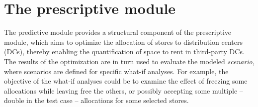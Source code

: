 \documentclass[ijoc,sglanonrev]{informs4}
\begin{document}
\section{The prescriptive module} \label{Sec:optimization}

The predictive module provides a structural component of the prescriptive module, which aims to optimize the allocation of stores to distribution centers (DCs), thereby enabling the quantification of space to rent in third-party DCs. The results of the optimization are in turn used to evaluate the modeled {\it scenario}, where scenarios are defined for specific what-if analyses. For example, the objective of the what-if analyses could be to examine the effect of freezing some allocations while leaving free the others, or possibly accepting some multiple -- double in the test case -- allocations for some selected stores. 
\end{document}
